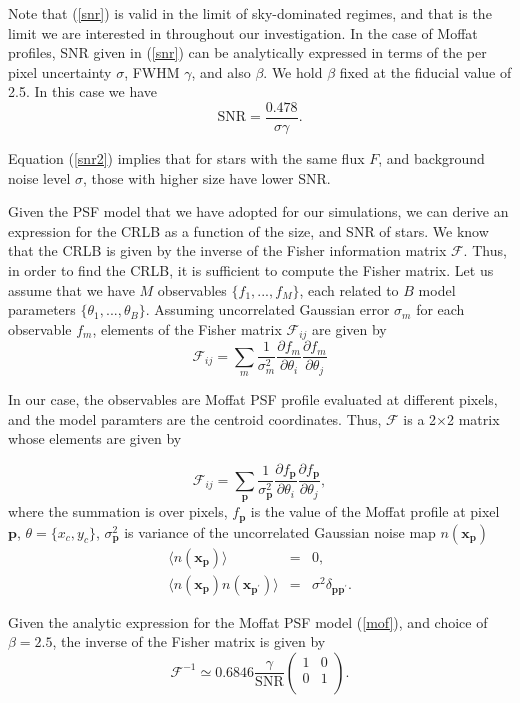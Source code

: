 \documentclass[12pt, preprint]{aastex}
\newcommand{\beq}{\begin{equation}}
\newcommand{\eeq}{\end{equation}}
\begin{document}
Note that (\ref{snr}) is valid in the limit of sky-dominated regimes,
and that is the limit we are interested in throughout our investigation.
 In the case of Moffat profiles, SNR given in (\ref{snr}) can be analytically 
expressed in terms of the per pixel uncertainty
$\sigma$, FWHM $\gamma$, and also $\beta$. We hold $\beta$ fixed at the fiducial value of 2.5.
In this case we have
\beq
\text{SNR} = \frac{0.478}{\sigma \gamma}.
\label{snr2}
\eeq

Equation (\ref{snr2}) implies that for stars with the same flux $F$,
 and background
noise level $\sigma$, those with higher size have lower SNR.

Given the PSF model that we have adopted for our simulations, we can derive
 an expression for the CRLB as a function of the size, and SNR of stars.
 We know that the CRLB is given by the inverse of 
the Fisher information matrix $\mathcal{F}$. Thus, in order to find the CRLB,
 it is sufficient to compute the Fisher matrix.
Let us assume that we have $M$ observables $\{f_{1}, ... , f_{M}\}$, each
related to $B$ model parameters $\{\theta_{1} , ... , \theta_{B}\}$. Assuming
uncorrelated Gaussian error $\sigma_{m}$ for each observable $f_{m}$, elements
of the Fisher matrix $\mathcal{F}_{ij}$ are given by
\beq
\mathcal{F}_{ij} = \sum_{m}\frac{1}{\sigma_{m}^{2}}\frac{\partial f_{m}}{\partial \theta_{i}}\frac{\partial f_{m}}{\partial \theta_{j}}
\label{fisher}
\eeq

In our case, the observables are Moffat PSF profile evaluated at different pixels, and  
the model paramters are the centroid coordinates. Thus, $\mathcal{F}$
is a 2$\times$2 matrix whose elements are given by

\beq
  \mathcal{F}_{ij} = \sum_{\mathbf{p}}\frac{1}{\sigma_{\mathbf{p}}^{2}}
                \frac{\partial f_{\mathbf{p}}}{\partial \theta_{i}}\frac{\partial f_{\mathbf{p}}}{\partial \theta_{j}},
\label{fish}
\eeq
where the summation is over pixels, $f_{\mathbf{p}}$ is the value of the Moffat profile at pixel $\mathbf{p}$,
$\theta=\{x_{c},y_{c}\}$, $\sigma_{\mathbf{p}}^{2}$ is variance
of the uncorrelated Gaussian noise map $n(\mathbf{x_{p}})$
\begin{eqnarray}
\langle n(\mathbf{x_{p}}) \rangle &=& 0, \\
\langle n(\mathbf{x_{p}})n(\mathbf{x_{p^{\prime}}}) \rangle &=& \sigma^{2}\delta_{\mathbf{p}\mathbf{p}^{\prime}}. 
\end{eqnarray}

Given the analytic expression for the Moffat PSF model (\ref{mof}), and choice of $\beta=2.5$, 
the inverse of the Fisher matrix is given by
\beq
  \mathcal{F}^{-1} \simeq 0.6846 \frac{\gamma}{\text{SNR}} 
  \begin{pmatrix}
      1 & 0\\
      0 & 1\\
  \end{pmatrix}.
\label{crlbmoffat}
\eeq
\end{document}
